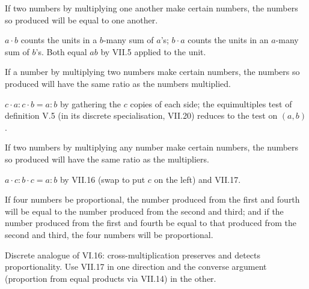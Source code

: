 \begin{claim}
\label{prop:VII.16}
If two numbers by multiplying one another make certain numbers, the
numbers so produced will be equal to one another.
\end{claim}
\begin{evidence}
\label{ev:VII.16}
$a \cdot b$ counts the units in a $b$-many sum of $a$'s; $b \cdot a$
counts the units in an $a$-many sum of $b$'s.  Both equal $ab$ by
VII.5 applied to the unit.
\end{evidence}

\begin{claim}
\label{prop:VII.17}
If a number by multiplying two numbers make certain numbers, the
numbers so produced will have the same ratio as the numbers
multiplied.
\end{claim}
\begin{evidence}
\label{ev:VII.17}
$c \cdot a : c \cdot b = a : b$ by gathering the $c$ copies of each
side; the equimultiples test of definition V.5 (in its discrete
specialisation, VII.20) reduces to the test on $(a, b)$.
\end{evidence}

\begin{claim}
\label{prop:VII.18}
If two numbers by multiplying any number make certain numbers, the
numbers so produced will have the same ratio as the multipliers.
\end{claim}
\begin{evidence}
\label{ev:VII.18}
$a \cdot c : b \cdot c = a : b$ by VII.16 (swap to put $c$ on the
left) and VII.17.
\end{evidence}

\begin{claim}
\label{prop:VII.19}
If four numbers be proportional, the number produced from the first
and fourth will be equal to the number produced from the second and
third; and if the number produced from the first and fourth be equal
to that produced from the second and third, the four numbers will be
proportional.
\end{claim}
\begin{evidence}
\label{ev:VII.19}
Discrete analogue of VI.16: cross-multiplication preserves and
detects proportionality.  Use VII.17 in one direction and the
converse argument (proportion from equal products via VII.14) in the
other.
\end{evidence}

